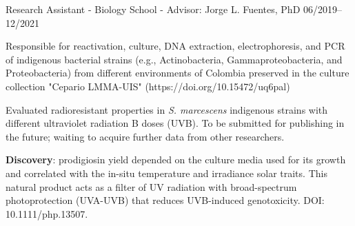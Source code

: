 \begin{cventries}
\vspace{-0.7cm}
\cventry
{Research Assistant - Biology School - Advisor: Jorge L. Fuentes, PhD}
{}
{}
{06/2019--12/2021}
{
\begin{cvitems} %
\item {Responsible for reactivation, culture, DNA extraction, electrophoresis, and PCR of indigenous bacterial strains (e.g., Actinobacteria, Gammaproteobacteria, and Proteobacteria) from different environments of Colombia preserved in the culture collection "Cepario LMMA-UIS" (https://doi.org/10.15472/uq6pal)}
\item {Evaluated radioresistant properties in \textit{S. marcescens} indigenous strains with different ultraviolet radiation B doses (UVB). To be submitted for publishing in the future; waiting to acquire further data from other researchers.}
\item {\textbf{Discovery}: prodigiosin yield depended on the culture media used for its growth and correlated with the in-situ temperature and irradiance solar traits. This natural product acts as a filter of UV radiation with broad-spectrum photoprotection (UVA-UVB) that reduces UVB-induced genotoxicity. DOI: 10.1111/php.13507.}
\end{cvitems}
}

\vspace{-0cm}


\end{cventries}
